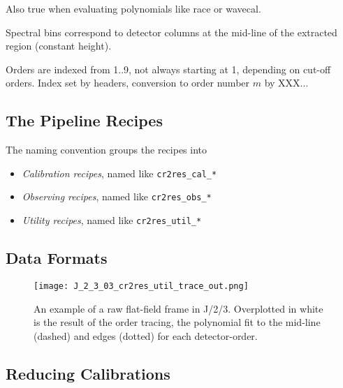 Also true when evaluating polynomials like race or wavecal.

Spectral bins correspond to detector columns at the mid-line of the extracted region (constant height).

Orders are indexed from 1..9, not always starting at 1, depending on cut-off orders. Index set by headers, conversion
to order number $m$ by XXX...

\subsection{The Pipeline Recipes}
\label{sec:recipes-quick}


The naming convention groups the recipes into
\begin{itemize}
    \item \textit{Calibration recipes}, named like \texttt{cr2res\_cal\_*}
    \item \textit{Observing recipes}, named like \texttt{cr2res\_obs\_*}
    \item \textit{Utility recipes}, named like \texttt{cr2res\_util\_*}
\end{itemize}

\subsection{Data Formats}
\label{sec:data-fmt-quick}


\begin{figure}[!tb]
  \begin{center}
    \texttt{[image: J\_2\_3\_03\_cr2res\_util\_trace\_out.png]}
  \end{center}
  \caption{
    \label{fig:flat_trace}
    An example of a raw flat-field frame in J/2/3. Overplotted in white is 
    the result of the order tracing, the polynomial fit to the mid-line
    (dashed) and edges (dotted) for each detector-order.
    }
\end{figure}



\subsection{Reducing Calibrations}
\label{sec:calib:reduc}

